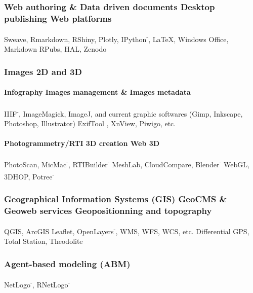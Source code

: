 \documentclass{article}
\begin{document}
\subsubsection*{Web authoring \& Data driven documents {\textbar} Desktop publishing {\textbar} Web platforms}

\textsf{Sweave}, \textsf{Rmarkdown}, \textsf{RShiny}, \textsf{Plotly}, \textsf{IPython\textsuperscript{-}}, \textbf{{\textbar}} \LaTeX, Windows Office, Markdown \textbf{{\textbar}} RPubs, HAL, Zenodo

\subsubsection*{Images 2D and 3D}

\paragraph*{Infography {\textbar} Images management \& Images metadata}

IIIF\textsuperscript{-}, ImageMagick, ImageJ, and current graphic softwares (Gimp, Inkscape, Photoshop, Illustrator) {\textbar} ExifTool , XnView, Piwigo, etc.

\paragraph*{Photogrammetry/RTI {\textbar} 3D creation {\textbar} Web 3D}

PhotoScan, MicMac\textsuperscript{-}, RTIBuilder\textsuperscript{-} {\textbar} MeshLab, CloudCompare, Blender\textsuperscript{-} \textbf{{\textbar}} WebGL, 3DHOP, Potree\textsuperscript{-}

\subsubsection*{Geographical Information Systems (GIS) {\textbar} GeoCMS \& Geoweb services {\textbar} Geopositionning and topography}

QGIS, ArcGIS {\textbar} \textsf{Leaflet}, \textsf{OpenLayers\textsuperscript{-}}, WMS, WFS, WCS, etc. {\textbar} Differential GPS, Total Station, Theodolite

\subsubsection*{Agent-based modeling (ABM)}

NetLogo\textsuperscript{-}, \textsf{RNetLogo\textsuperscript{-}}
\end{document}
